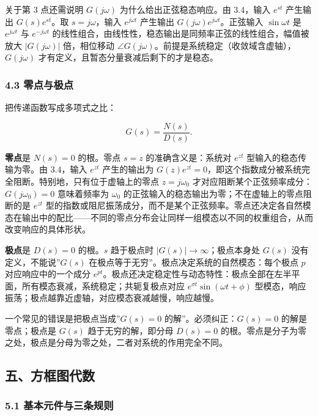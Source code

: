 \documentclass[12pt]{ctexart}
\begin{document}
关于第 3 点还需说明 \(G(j\omega)\) 为什么给出正弦稳态响应。由 3.4，输入
\(e^{st}\) 产生输出 \(G(s)e^{st}\)。取 \(s=j\omega\)，输入
\(e^{j\omega t}\) 产生输出 \(G(j\omega)e^{j\omega t}\)。正弦输入
\(\sin\omega t\) 是 \(e^{j\omega t}\) 与 \(e^{-j\omega t}\)
的线性组合，由线性性，稳态输出是同频率正弦的线性组合，幅值被放大
\(|G(j\omega)|\) 倍，相位移动
\(\angle G(j\omega)\)。前提是系统稳定（收敛域含虚轴），\(G(j\omega)\)
才有定义，且暂态分量衰减后剩下的才是稳态。

\hypertarget{ux96f6ux70b9ux4e0eux6781ux70b9}{%
\subsubsection{4.3 零点与极点}\label{ux96f6ux70b9ux4e0eux6781ux70b9}}

把传递函数写成多项式之比：

\[
G(s)=\frac{N(s)}{D(s)}.
\]

\textbf{零点}是 \(N(s)=0\) 的根。零点 \(s=z\) 的准确含义是：系统对
\(e^{zt}\) 型输入的稳态传输为零。由 3.4，输入 \(e^{zt}\) 产生的输出为
\(G(z)e^{zt}=0\)，即这个指数成分被系统完全阻断。特别地，只有位于虚轴上的零点
\(z=j\omega_0\) 才对应阻断某个正弦频率成分：\(G(j\omega_0)=0\)
意味着频率为 \(\omega_0\)
的正弦输入的稳态输出为零；不在虚轴上的零点阻断的是 \(e^{zt}\)
型的指数或阻尼振荡成分，而不是某个正弦频率。零点还决定各自然模态在输出中的配比------不同的零点分布会让同样一组模态以不同的权重组合，从而改变响应的具体形状。

\textbf{极点}是 \(D(s)=0\) 的根。\(s\) 趋于极点时
\(|G(s)|\to\infty\)；极点本身处 \(G(s)\) 没有定义，不能说''\(G(s)\)
在极点等于无穷''。极点决定系统的自然模态：每个极点 \(p\)
对应响应中的一个成分
\(e^{pt}\)。极点还决定稳定性与动态特性：极点全部在左半平面，所有模态衰减，系统稳定；共轭复极点对应
\(e^{\sigma t}\sin(\omega t+\phi)\)
型模态，响应振荡；极点越靠近虚轴，对应模态衰减越慢，响应越慢。

一个常见的错误是把极点当成''\(G(s)=0\) 的解''。必须纠正：\(G(s)=0\)
的解是零点；极点是 \(G(s)\) 趋于无穷的解，即分母 \(D(s)=0\)
的根。零点是分子为零之处，极点是分母为零之处，二者对系统的作用完全不同。

\hypertarget{ux4e94ux65b9ux6846ux56feux4ee3ux6570}{%
\subsection{五、方框图代数}\label{ux4e94ux65b9ux6846ux56feux4ee3ux6570}}

\hypertarget{ux57faux672cux5143ux4ef6ux4e0eux4e09ux6761ux89c4ux5219}{%
\subsubsection{5.1
基本元件与三条规则}\label{ux57faux672cux5143ux4ef6ux4e0eux4e09ux6761ux89c4ux5219}}
\end{document}
